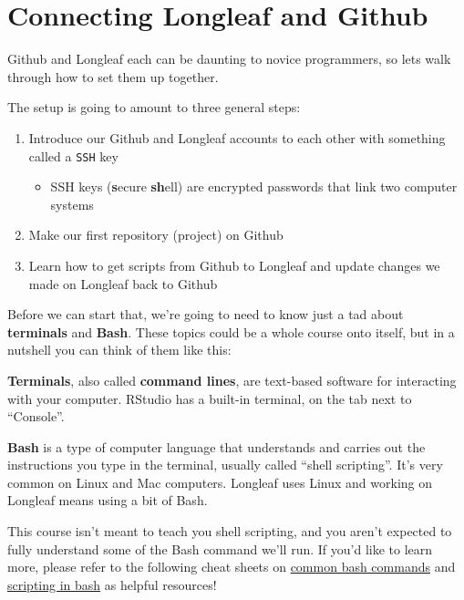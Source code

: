 \documentclass[
  letterpaper,
  DIV=11,
  numbers=noendperiod]{scrreprt}
\providecommand{\tightlist}{%
  \setlength{\itemsep}{0pt}\setlength{\parskip}{0pt}}\usepackage{longtable,booktabs,array}
\begin{document}
\hypertarget{connecting-longleaf-and-github}{%
\section{Connecting Longleaf and
Github}\label{connecting-longleaf-and-github}}

Github and Longleaf each can be daunting to novice programmers, so lets
walk through how to set them up together.

The setup is going to amount to three general steps:

\begin{enumerate}
\def\labelenumi{\arabic{enumi}.}
\tightlist
\item
  Introduce our Github and Longleaf accounts to each other with
  something called a \texttt{SSH} key

  \begin{itemize}
  \tightlist
  \item
    SSH keys (\textbf{s}ecure \textbf{sh}ell) are encrypted passwords
    that link two computer systems
  \end{itemize}
\item
  Make our first repository (project) on Github
\item
  Learn how to get scripts from Github to Longleaf and update changes we
  made on Longleaf back to Github
\end{enumerate}

Before we can start that, we're going to need to know just a tad about
\textbf{terminals} and \textbf{Bash}. These topics could be a whole
course onto itself, but in a nutshell you can think of them like this:

\textbf{Terminals}, also called \textbf{command lines}, are text-based
software for interacting with your computer. RStudio has a built-in
terminal, on the tab next to ``Console''.

\textbf{Bash} is a type of computer language that understands and
carries out the instructions you type in the terminal, usually called
``shell scripting''. It's very common on Linux and Mac computers.
Longleaf uses Linux and working on Longleaf means using a bit of Bash.

\begin{tcolorbox}[enhanced jigsaw, left=2mm, colframe=quarto-callout-tip-color-frame, leftrule=.75mm, opacitybacktitle=0.6, toptitle=1mm, title=\textcolor{quarto-callout-tip-color}{\faLightbulb}\hspace{0.5em}{Tip}, opacityback=0, coltitle=black, colbacktitle=quarto-callout-tip-color!10!white, breakable, colback=white, titlerule=0mm, bottomrule=.15mm, arc=.35mm, bottomtitle=1mm, rightrule=.15mm, toprule=.15mm]

This course isn't meant to teach you shell scripting, and you aren't
expected to fully understand some of the Bash command we'll run. If
you'd like to learn more, please refer to the following cheat sheets on
\href{https://github.com/RehanSaeed/Bash-Cheat-Sheet}{common bash
commands} and \href{https://devhints.io/bash}{scripting in bash} as
helpful resources!

\end{tcolorbox}
\end{document}
